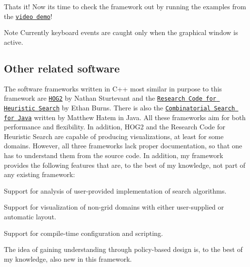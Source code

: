 That\textquotesingle{}s it! Now it\textquotesingle{}s time to check the framework out by running the examples from the \href{https://youtu.be/cElxLWve1Zw}{\tt video demo}! \begin{DoxyNote}{Note}
Currently keyboard events are caught only when the graphical window is active.
\end{DoxyNote}
\hypertarget{index_s-related}{}\subsection{Other related software}\label{index_s-related}
The software frameworks written in {\ttfamily C++} most similar in purpose to this framework are \href{https://github.com/nathansttt/hog2}{\tt H\+O\+G2} by Nathan Sturtevant and the \href{https://github.com/eaburns/search}{\tt Research Code for Heuristic Search} by Ethan Burns. There is also the \href{https://github.com/matthatem/cs4j}{\tt Combinatorial Search for Java} written by Matthew Hatem in {\ttfamily Java}. All these frameworks aim for both performance and flexibility. In addition, {\ttfamily H\+O\+G2} and the {\ttfamily Research Code for Heuristic Search} are capable of producing visualizations, at least for some domains. However, all three frameworks lack proper documentation, so that one has to understand them from the source code. In addition, my framework provides the following features that are, to the best of my knowledge, not part of any existing framework\+:
\begin{DoxyItemize}
\item Support for analysis of user-\/provided implementation of search algorithms.
\item Support for visualization of non-\/grid domains with either user-\/supplied or automatic layout.
\item Support for compile-\/time configuration and scripting.
\item The idea of gaining understanding through policy-\/based design is, to the best of my knowledge, also new in this framework.
\end{DoxyItemize}

